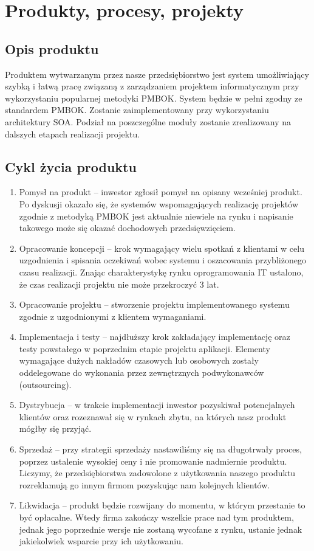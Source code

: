 
\section{Produkty, procesy, projekty}

\subsection*{Opis produktu}
Produktem wytwarzanym przez nasze przedsiębiorstwo jest system umożliwiający szybką i łatwą pracę związaną z zarządzaniem projektem informatycznym przy wykorzystaniu popularnej metodyki PMBOK. System będzie w pełni zgodny ze standardem PMBOK. Zostanie zaimplementowany przy wykorzystaniu architektury SOA. Podział na poszczególne moduły zostanie zrealizowany na dalszych etapach realizacji projektu.

\subsection*{Cykl życia produktu}
\begin{enumerate}
	\item Pomysł na produkt – inwestor zgłosił pomysł na opisany wcześniej produkt. Po dyskusji okazało się, że systemów wspomagających realizację projektów zgodnie z metodyką PMBOK jest aktualnie niewiele na rynku i napisanie takowego może się okazać dochodowych przedsięwzięciem.
	\item Opracowanie koncepcji – krok wymagający wielu spotkań z klientami w celu uzgodnienia i spisania oczekiwań wobec systemu i oszacowania przybliżonego czasu realizacji. Znając charakterystykę rynku oprogramowania IT ustalono, że czas realizacji projektu nie może przekroczyć 3 lat.
	\item Opracowanie projektu – stworzenie projektu implementowanego systemu zgodnie z uzgodnionymi z klientem wymaganiami.
	\item Implementacja i testy – najdłuższy krok zakładający implementację oraz testy powstałego w poprzednim etapie projektu aplikacji. Elementy wymagające dużych nakładów czasowych lub osobowych zostały oddelegowane do wykonania przez zewnętrznych podwykonawców (outsourcing).
	\item Dystrybucja – w trakcie implementacji inwestor pozyskiwał potencjalnych klientów oraz rozeznawał się w rynkach zbytu, na których nasz produkt mógłby się przyjąć.
	\item Sprzedaż – przy strategii sprzedaży nastawiliśmy się na długotrwały proces, poprzez ustalenie wysokiej ceny i nie promowanie nadmiernie produktu. Liczymy, że przedsiębiorstwa zadowolone z użytkowania naszego produktu rozreklamują go innym firmom pozyskując nam kolejnych klientów.
	\item Likwidacja – produkt będzie rozwijany do momentu, w którym przestanie to być opłacalne. Wtedy firma zakończy wszelkie prace nad tym produktem, jednak jego poprzednie wersje nie zostaną wycofane z rynku, ustanie jednak jakiekolwiek wsparcie przy ich użytkowaniu.
\end{enumerate}

